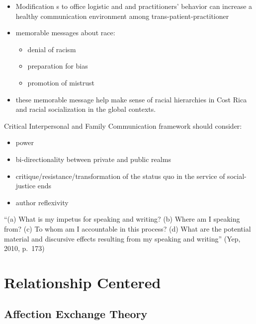 \documentclass[
]{book}
\providecommand{\tightlist}{%
  \setlength{\itemsep}{0pt}\setlength{\parskip}{0pt}}
\begin{document}
\citep{Ross_2016}

\begin{itemize}
\tightlist
\item
  Modification s to office logistic and and practitioners' behavior can increase a healthy communication environment
  among trans-patient-practitioner
\end{itemize}

\citep{Nuru_2018}

\begin{itemize}
\item
  memorable messages about race:

  \begin{itemize}
  \item
    denial of racism
  \item
    preparation for bias
  \item
    promotion of mistrust
  \end{itemize}
\item
  these memorable message help make sense of racial hierarchies in Cost Rica and racial socialization in the global
  contexts.
\end{itemize}

\citep{Suter_2017}

Critical Interpersonal and Family Communication framework should consider:

\begin{itemize}
\tightlist
\item
  power
\item
  bi-directionality between private and public realms
\item
  critique/resistance/transformation of the status quo in the service of social-justice ends
\item
  author reflexivity
\end{itemize}

``(a) What is my impetus for speaking and writing? (b) Where am I speaking from? (c) To whom am I accountable in this
process? (d) What are the potential material and discursive effects resulting from my speaking and writing'' (Yep, 2010,
p.~173)

\hypertarget{relationship-centered}{%
\chapter{Relationship Centered}\label{relationship-centered}}

\hypertarget{affection-exchange-theory-1}{%
\section{Affection Exchange Theory}\label{affection-exchange-theory-1}}
\end{document}

